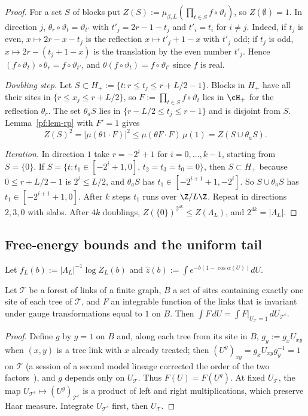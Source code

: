 \begin{proof}
For a set $S$ of blocks put $Z(S):=\mu_{\beta,L}(\prod_{t\in S}f\circ\vartheta_t)$, so $Z(\emptyset)=1$.
In direction $j$, $\theta_r\circ\vartheta_t=\vartheta_{t'}$ with $t'_j=2r-1-t_j$ and $t'_i=t_i$ for $i\ne j$. Indeed, if $t_j$ is even, $x\mapsto2r-x-t_j$ is the reflection $x\mapsto t'_j+1-x$ with $t'_j$ odd; if $t_j$ is odd, $x\mapsto2r-(t_j+1-x)$ is the translation by the even number $t'_j$. Hence $(f\circ\vartheta_t)\circ\theta_r=f\circ\vartheta_{t'}$, and $\theta(f\circ\vartheta_t)=f\circ\vartheta_{t'}$ since $f$ is real.

\emph{Doubling step.} Let $S\subset H_+:=\{t:r\le t_j\le r+L/2-1\}$. Blocks in $H_+$ have all their sites in $\{r\le x_j\le r+L/2\}$, so $F:=\prod_{t\in S}f\circ\vartheta_t$ lies in $\cH_+$ for the reflection $\theta_r$. The set $\theta_aS$ lies in $\{r-L/2\le t_j\le r-1\}$ and is disjoint from $S$. Lemma~\ref{pf:lem-rp} with $F'=1$ gives
\[
Z(S)^2=|\mu(\theta1\cdot F)|^2\le\mu(\theta F\cdot F)\,\mu(1)=Z(S\cup\theta_aS).
\]

\emph{Iteration.} In direction $1$ take $r=-2^i+1$ for $i=0,\dots,k-1$, starting from $S=\{0\}$. If $S=\{t:t_1\in[-2^i+1,0],\,t_2=t_3=t_0=0\}$, then $S\subset H_+$ because $0\le r+L/2-1$ is $2^i\le L/2$, and $\theta_aS$ has $t_1\in[-2^{i+1}+1,-2^i]$. So $S\cup\theta_aS$ has $t_1\in[-2^{i+1}+1,0]$. After $k$ steps $t_1$ runs over $\Z/L\Z$. Repeat in directions $2,3,0$ with slabs. After $4k$ doublings, $Z(\{0\})^{2^{4k}}\le Z(\Lambda_L)$, and $2^{4k}=|\Lambda_L|$.
\end{proof}

\subsection{Free-energy bounds and the uniform tail}\label{pf:sec-free}

Let $f_L(b):=|\Lambda_L|^{-1}\log Z_L(b)$ and $\hat z(b):=\int e^{-b(1-\cos\alpha(U))}dU$.

\begin{lemma}\label{pf:lem-forest}
Let $\mathcal T$ be a forest of links of a finite graph, $B$ a set of sites containing exactly one site of each tree of $\mathcal T$, and $F$ an integrable function of the links that is invariant under gauge transformations equal to $1$ on $B$. Then $\int F\,dU=\int F|_{U_{\mathcal T}=1}\,dU_{\mathcal T^c}$.
\end{lemma}

\begin{proof}
Define $g$ by $g=1$ on $B$ and, along each tree from its site in $B$, $g_y:=g_xU_{xy}$ when $(x,y)$ is a tree link with $x$ already treated; then $(U^g)_{xy}=g_xU_{xy}g_y^{-1}=1$ on $\mathcal T$ (a session of a second model lineage corrected the order of the two factors~\cite[comments 7105447358, 7105348719, 7105100783]{RepoThread}), and $g$ depends only on $U_{\mathcal T}$. Thus $F(U)=F(U^g)$. At fixed $U_{\mathcal T}$, the map $U_{\mathcal T^c}\mapsto(U^g)_{\mathcal T^c}$ is a product of left and right multiplications, which preserve Haar measure. Integrate $U_{\mathcal T^c}$ first, then $U_{\mathcal T}$.
\end{proof}

